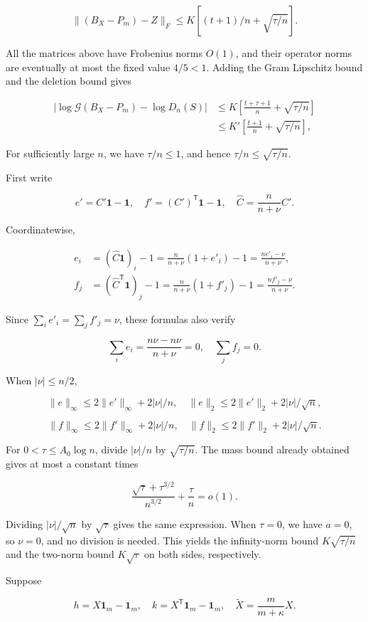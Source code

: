 \documentclass[11pt,a4paper]{article}
\begin{document}
\[
\|(B_X-P_m)-Z\|_F
\le K[(t+1)/n+\sqrt{\tau/n}].
\]

All the matrices above have Frobenius norms \(O(1)\), and their operator norms are eventually at most the fixed value \(4/5<1\). Adding the Gram Lipschitz bound and the deletion bound gives

\[
\begin{aligned}
|\log\mathcal G(B_X-P_m)-\log D_n(S)|
&\le K\left[\frac{t+\tau+1}n+\sqrt{\tau/n}\right]\\
&\le K'\left[\frac{t+1}n+\sqrt{\tau/n}\right],
\end{aligned}
\]

For sufficiently large \(n\), we have \(\tau/n\le1\), and hence \(\tau/n\le\sqrt{\tau/n}\).

First write

\[
e'=C'\mathbf1-\mathbf1,\quad
f'=(C')^{\mathsf T}\mathbf1-\mathbf1,\quad
\widehat C=\frac n{n+\nu}C'.
\]

Coordinatewise,

\[
\begin{aligned}
e_i&=(\widehat C\mathbf1)_i-1
=\frac n{n+\nu}(1+e'_i)-1
=\frac{ne'_i-\nu}{n+\nu},\\
f_j&=(\widehat C^{\mathsf T}\mathbf1)_j-1
=\frac n{n+\nu}(1+f'_j)-1
=\frac{nf'_j-\nu}{n+\nu}.
\end{aligned}
\]

Since \(\sum_ie'_i=\sum_jf'_j=\nu\), these formulas also verify

\[
\sum_ie_i=\frac{n\nu-n\nu}{n+\nu}=0,\quad
\sum_jf_j=0.
\]

When \(|\nu|\le n/2\),

\[
\|e\|_\infty\le2\|e'\|_\infty+2|\nu|/n,\quad
\|e\|_2\le2\|e'\|_2+2|\nu|/\sqrt n,
\]

\[
\|f\|_\infty\le2\|f'\|_\infty+2|\nu|/n,\quad
\|f\|_2\le2\|f'\|_2+2|\nu|/\sqrt n.
\]

For \(0<\tau\le A_0\log n\), divide \(|\nu|/n\) by \(\sqrt{\tau/n}\). The mass bound already obtained gives at most a constant times

\[
\frac{\sqrt\tau+\tau^{3/2}}{n^{3/2}}+\frac\tau n=o(1).
\]

Dividing \(|\nu|/\sqrt n\) by \(\sqrt\tau\) gives the same expression. When \(\tau=0\), we have \(a=0\), so \(\nu=0\), and no division is needed. This yields the infinity-norm bound \(K\sqrt{\tau/n}\) and the two-norm bound \(K\sqrt\tau\) on both sides, respectively.

Suppose

\[
h=X\mathbf1_m-\mathbf1_m,\quad
k=X^{\mathsf T}\mathbf1_m-\mathbf1_m,\quad
\widetilde X=\frac m{m+\kappa}X.
\]
\end{document}
